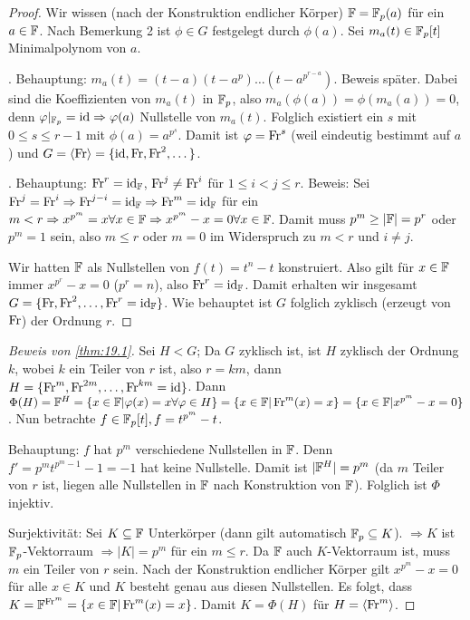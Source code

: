 \documentclass[12pt,a4paper]{scrartcl}
\begin{document}
\begin{proof}
	Wir wissen (nach der Konstruktion endlicher Körper) $\mathbb F = \mathbb F_p(a)$ für ein $a\in \mathbb F$. Nach Bemerkung 2 ist $\phi\in G$ festgelegt durch $\phi(a)$. Sei $m_a(t)\in\mathbb F_p[t]$ Minimalpolynom von $a$.
	
	. Behauptung: $m_a(t) = (t-a)(t-a^p)\dots(t-a^{p^{r-a}})$. Beweis später. Dabei sind die Koeffizienten von $m_a(t)$ in $\mathbb F_p$, also $m_a(\phi(a)) = \phi(m_a(a)) = 0$, denn $\varphi|_{\mathbb F_p} = \operatorname{id}\Rightarrow \varphi(a)$ Nullstelle von $m_a(t)$. Folglich existiert ein $s$ mit $0\leq s\leq r-1$ mit $\phi(a) = a^{p^s}$. Damit ist $\varphi = \operatorname{Fr}^s$ (weil eindeutig bestimmt auf $a$) und $G = \langle\operatorname{Fr}\rangle = \{\operatorname{id}, \operatorname{Fr}, \operatorname{Fr}^2,\dots\}$.
	
	. Behauptung: $\operatorname{Fr}^r = \operatorname{id}_{\mathbb F}$, $\operatorname{Fr}^j\neq \operatorname{Fr}^i$ für $1\leq i<j\leq r$.
	Beweis: Sei $\operatorname{Fr}^j = \operatorname{Fr}^i\Rightarrow \operatorname{Fr}^{j-i} = \operatorname{id}_{\mathbb F}\Rightarrow \operatorname{Fr}^m = \operatorname{id}_{\mathbb F}$ für ein $m<r\Rightarrow x^{p^m} = x\forall x\in \mathbb F\Rightarrow x^{p^m}-x = 0\forall x\in\mathbb F$. Damit muss $p^m\geq|\mathbb F| = p^r$ oder $p^m = 1$ sein, also $m\leq r$ oder $m = 0$ im Widerspruch zu $m<r$ und $i\neq j$.
	
	Wir hatten $\mathbb F$ als Nullstellen von $f(t) = t^n-t$ konstruiert. Also gilt für $x\in \mathbb F$ immer $x^{p^r} -x = 0$ ($p^r = n$), also $\operatorname{Fr}^r = \operatorname{id}_{\mathbb F}$. Damit erhalten wir insgesamt $G = \{\operatorname{Fr}, \operatorname{Fr}^2,\dots, \operatorname{Fr}^r = \operatorname{id}_{\mathbb F}\}$. Wie behauptet ist $G$ folglich zyklisch (erzeugt von $\operatorname{Fr}$) der Ordnung $r$.
\end{proof}

\begin{proof}[Beweis von \ref{thm:19.1}]
	Sei $H<G$; Da $G$ zyklisch ist, ist $H$ zyklisch der Ordnung $k$, wobei $k$ ein Teiler von $r$ ist, also $r = km$, dann $H = \{\operatorname{Fr}^m, \operatorname{Fr}^{2m},\dots, \operatorname{Fr}^{km} = \operatorname{id}\}$. Dann $\Phi(H) = \mathbb F^H = \{x\in\mathbb F|\varphi(x) = x\forall\varphi\in H\} = \{x\in \mathbb F|\operatorname{Fr}^m(x) = x\} = \{x\in\mathbb F|x^{p^m}-x = 0\}$. Nun betrachte $f\in \mathbb F_p[t], f = t^{p^m}-t$.
	
	\noindent Behauptung: $f$ hat $p^m$ verschiedene Nullstellen in $\mathbb F$. Denn $f' = p^mt^{p^m-1}-1 = -1$ hat keine Nullstelle. Damit ist $|\mathbb F^H| = p^m$ (da $m$ Teiler von $r$ ist, liegen alle Nullstellen in $\mathbb F$ nach Konstruktion von $\mathbb F$). Folglich ist $\Phi$ injektiv.
	
	\noindent Surjektivität: Sei $K\subseteq \mathbb F$ Unterkörper (dann gilt automatisch $\mathbb F_p\subseteq K$). $\Rightarrow K$ ist $\mathbb F_p$-Vektorraum $\Rightarrow |K| = p^m$ für ein $m\leq r$. Da $\mathbb F$ auch $K$-Vektorraum ist, muss $m$ ein Teiler von $r$ sein. Nach der Konstruktion endlicher Körper gilt $x^{p^m}-x = 0$ für alle $x\in K$ und $K$ besteht genau aus diesen Nullstellen. Es folgt, dass $K = \mathbb F^{\operatorname{Fr}^m} = \{x\in \mathbb F|\operatorname{Fr}^m(x) = x\}$. Damit $K = \Phi(H)$ für $H = \langle\operatorname{Fr}^m\rangle$. 
\end{proof}
\end{document}
